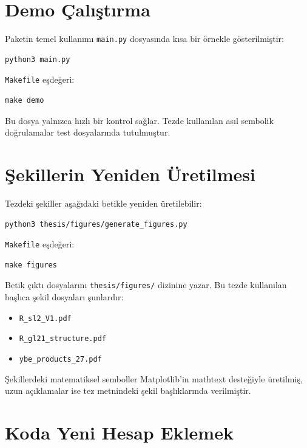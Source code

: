 \documentclass[12pt,a4paper,fleqn]{report}
\numberwithin{equation}{chapter}
\theoremstyle{plain}
\theoremstyle{definition}
\begin{document}
\section{Demo Çalıştırma}

Paketin temel kullanımı \texttt{main.py} dosyasında kısa bir örnekle
gösterilmiştir:
\begin{lstlisting}[style=bashblock]
python3 main.py
\end{lstlisting}

\texttt{Makefile} eşdeğeri:
\begin{lstlisting}[style=bashblock]
make demo
\end{lstlisting}

Bu dosya yalnızca hızlı bir kontrol sağlar. Tezde kullanılan asıl sembolik
doğrulamalar test dosyalarında tutulmuştur.

\section{Şekillerin Yeniden Üretilmesi}

Tezdeki şekiller aşağıdaki betikle yeniden üretilebilir:
\begin{lstlisting}[style=bashblock]
python3 thesis/figures/generate_figures.py
\end{lstlisting}

\texttt{Makefile} eşdeğeri:
\begin{lstlisting}[style=bashblock]
make figures
\end{lstlisting}

Betik çıktı dosyalarını \texttt{thesis/figures/} dizinine yazar. Bu tezde
kullanılan başlıca şekil dosyaları şunlardır:
\begin{itemize}[leftmargin=*]
  \item \texttt{R\_sl2\_V1.pdf}
  \item \texttt{R\_gl21\_structure.pdf}
  \item \texttt{ybe\_products\_27.pdf}
\end{itemize}

Şekillerdeki matematiksel semboller Matplotlib'in mathtext desteğiyle
üretilmiş, uzun açıklamalar ise tez metnindeki şekil başlıklarında verilmiştir.

\section{Koda Yeni Hesap Eklemek}
\end{document}
